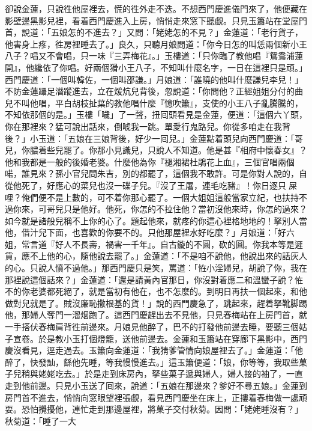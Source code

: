 卻說金蓮，只說徃他屋裡去，慌的徃外走不迭。不想西門慶進儀門來了，他便藏在影壁邊黑影兒裡，看着西門慶進入上房，悄悄走來窓下聽覷。{}只見玉簫站在堂屋門首，說道：「五娘怎的不進去？」又問：「姥姥怎的不見？」金蓮道：「老行貨子，他害身上疼，徃房裡睡去了。」良久，只聽月娘問道：「你今日怎的叫恁兩個新小王八子？唱又不會唱，只一味『三弄梅花』。」玉樓道：「只你臨了教他唱『鴛鴦浦蓮開』，他纔依了你唱。好兩個猾小王八子，不知叫什麼名字，一日在這裡只是頑。」西門慶道：「一個叫韓佐，一個叫邵謙。」月娘道：「誰曉的他叫什麼謙兒李兒！」不防金蓮躡足潛蹤進去，立在煖炕兒背後，忽說道：「你問他？正經姐姐分付的曲兒不叫他唱，平白胡枝扯葉的教他唱什麼『憶吹簫』，支使的小王八子亂騰騰的，不知依那個的是。」玉樓「噦」了一聲，扭囘頭看見是金蓮，便道：「這個六丫頭，你在那裡來？猛可說出話來，倒唬我一跳。{}單愛行鬼路兒。你從多咱走在我背後？」小玉道：「五娘在三娘背後，好少一囘兒。」金蓮點着頭兒向西門慶道：「哥兒，你膿着些兒罷了。你那小見識兒，只說人不知道。他是甚『相府中懷春女』？他和我都是一般的後婚老婆。{}什麼他為你『褪湘裙杜鵑花上血』，三個官唱兩個喏，誰見來？孫小官兒問朱吉，別的都罷了，這個我不敢許。可是你對人說的，自從他死了，好應心的菜兒也沒一碟子兒。『沒了王屠，連毛吃豬』！你日逐只𠳹屎哩？俺們便不是上數的，可不着你那心罷了。一個大姐姐這般當家立紀，也扶持不過你來，{}可哥兒只是他好。他死，你怎的不拉住他？當初沒他來時，你怎的過來？如今就是諸般兒稱不上你的心了。題起他來，就疼的你這心裡格地地的！拏別人當他，借汁兒下面，{}也喜歡的你要不的。只他那屋裡水好吃麼？」月娘道：「好六姐，常言道『好人不長壽，禍害一千年』。{}自古鏇的不圓，砍的圓。你我本等是遲貨，應不上他的心，隨他說去罷了。」金蓮道：「不是咱不說他，他說出來的話灰人的心。只說人憤不過他。」那西門慶只是笑，罵道：「恠小淫婦兒，胡說了你，我在那裡說這個話來？」金蓮道：「還是請黃內官那日，{}你沒對着應二和溫蠻子說？{}恠不的你老婆都死絕了，就是當初有他在，也不怎麼的。到明日再扶一個起來，和他做對兒就是了。{}賊沒廉恥撒根基的貨！」說的西門慶急了，跳起來，趕着拏靴脚踢他，那婦人奪門一溜烟跑了。{}這西門慶趕出去不見他，只見春梅站在上房門首，就一手搭伏春梅肩背徃前邊來。{}月娘見他醉了，巴不的打發他前邊去睡，要聽三個姑子宣卷。於是教小玉打個燈籠，送他前邊去。金蓮和玉簫站在穿廊下黑影中，西門慶沒看見，逕走過去。玉簫向金蓮道：「我猜爹管情向娘屋裡去了。」金蓮道：「他醉了，快發訕，{}繇他先睡，等我慢慢進去。」{}這玉簫便道：「娘，你等等，我取些菓子兒稍與姥姥吃去。」{}於是走到床房內，拏些菓子遞與婦人，婦人接的袖了，一直走到他前邊。只見小玉送了囘來，說道：「五娘在那邊來？爹好不尋五娘。」金蓮到房門首不進去，悄悄向窓眼望裡張覷，看見西門慶坐在床上，正摟着春梅做一處頑耍。恐怕攪擾他，連忙走到那邊屋裡，將菓子交付秋菊。因問：「姥姥睡沒有？」秋菊道：「睡了一大